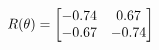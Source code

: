 \documentclass[preview]{standalone}
\begin{document}
\begin{align*}
\special{dvisvgm:raw <g id='unique000'>}R(\theta) = \begin{bmatrix}-0.74 & 0.67\\-0.67 & -0.74\end{bmatrix}\special{dvisvgm:raw </g>}
\end{align*}
\end{document}
